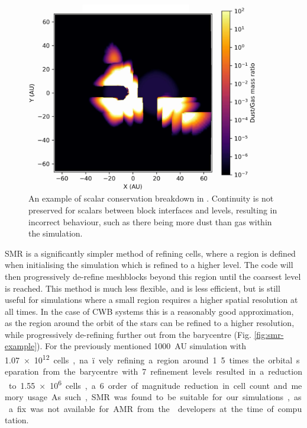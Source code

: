 \begin{figure}[ht]
  \centering
  \includegraphics[width=4in]{assets/refinement/breakdown.png}
  \caption[AMR breakdown in \athena]{An example of scalar conservation breakdown in \athena. Continuity is not preserved for scalars between block interfaces and levels, resulting in incorrect behaviour, such as there being more dust than gas within the simulation.}
  \label{fig:amrbreakdown}
\end{figure}

SMR is a significantly simpler method of refining cells, where a region is defined when initialising the simulation which is refined to a higher level.
The code will then progressively de-refine meshblocks beyond this region until the coarsest level is reached.
This method is much less flexible, and is less efficient, but is still useful for simulations where a small region requires a higher spatial resolution at all times. 
In the case of CWB systems this is a reasonably good approximation, as the region around the orbit of the stars can be refined to a higher resolution, while progressively de-refining further out from the barycentre (Fig. \ref{fig:smr-example}).
For the previously mentioned \SI{1000}{AU} simulation with \SI{1.07e12} cells, na\"ively refining a region around 1.5 times the orbital separation from the barycentre with 7 refinement levels resulted in a reduction to \num{1.55e6} cells, a 6 order of magnitude reduction in cell count and memory usage.
As such, SMR was found to be suitable for our simulations, as a fix was not available for AMR from the \athena{} developers at the time of computation.

